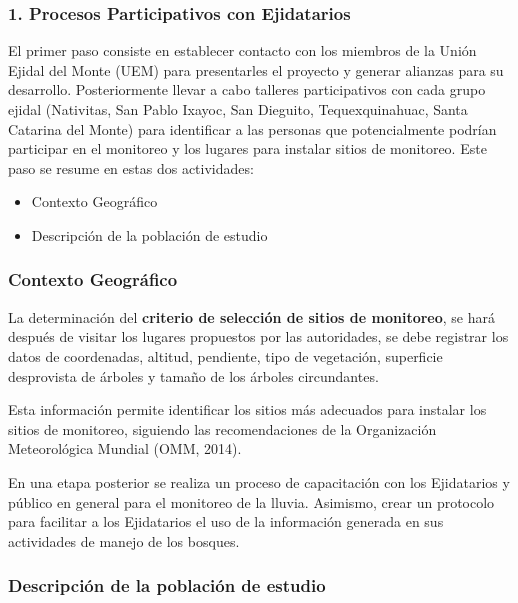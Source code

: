 \subsubsection{1. Procesos Participativos con Ejidatarios} 
El primer paso consiste en establecer contacto con los miembros de la Unión Ejidal del Monte (UEM) para presentarles el proyecto y generar alianzas para su desarrollo. Posteriormente llevar a cabo talleres participativos con cada grupo ejidal (Nativitas, San Pablo Ixayoc, San Dieguito, Tequexquinahuac, Santa Catarina del Monte) para identificar a las personas que potencialmente podrían participar en el monitoreo y los lugares para instalar sitios de monitoreo. Este paso se resume en estas dos actividades:
\begin{itemize}
  \item Contexto Geográfico
  \item Descripción de la población de estudio
\end{itemize}


\subsubsection*{Contexto Geográfico}
La determinación del \textbf{criterio de selección de sitios de monitoreo}, se hará después de visitar los lugares propuestos por las autoridades, se debe registrar los datos de coordenadas, altitud, pendiente, tipo de vegetación, superficie desprovista de árboles y tamaño de los árboles circundantes. 

Esta información permite identificar los sitios más adecuados para instalar los sitios de monitoreo, siguiendo las recomendaciones de la Organización Meteorológica Mundial (OMM, 2014). 

En una etapa posterior se realiza un proceso de capacitación con los Ejidatarios y público en general para el monitoreo de la lluvia. Asimismo, crear un protocolo para facilitar a los Ejidatarios el uso de la información generada en sus actividades de manejo de los bosques.

\subsubsection*{Descripción de la población de estudio}

